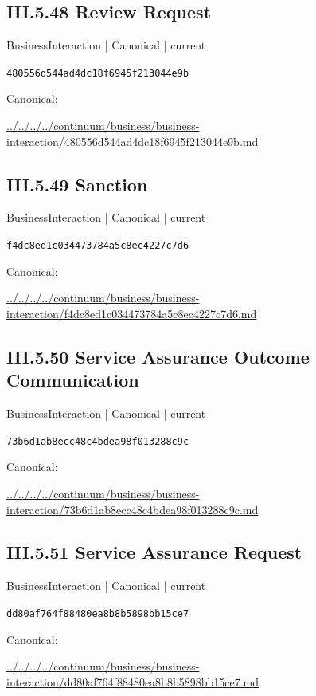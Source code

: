 \documentclass[10pt,a4paper]{article}
\begin{document}
\subsection*{III.5.48 Review Request}
\label{element-480556d544ad4dc18f6945f213044e9b}
{\small BusinessInteraction | Canonical | current}\par
\texttt{480556d544ad4dc18f6945f213044e9b}\par
Canonical: \par
{\footnotesize\url{../../../../continuum/business/business-interaction/480556d544ad4dc18f6945f213044e9b.md}}\par
\subsection*{III.5.49 Sanction}
\label{element-f4dc8ed1c034473784a5c8ec4227c7d6}
{\small BusinessInteraction | Canonical | current}\par
\texttt{f4dc8ed1c034473784a5c8ec4227c7d6}\par
Canonical: \par
{\footnotesize\url{../../../../continuum/business/business-interaction/f4dc8ed1c034473784a5c8ec4227c7d6.md}}\par
\subsection*{III.5.50 Service Assurance Outcome Communication}
\label{element-73b6d1ab8ecc48c4bdea98f013288c9c}
{\small BusinessInteraction | Canonical | current}\par
\texttt{73b6d1ab8ecc48c4bdea98f013288c9c}\par
Canonical: \par
{\footnotesize\url{../../../../continuum/business/business-interaction/73b6d1ab8ecc48c4bdea98f013288c9c.md}}\par
\subsection*{III.5.51 Service Assurance Request}
\label{element-dd80af764f88480ea8b8b5898bb15ce7}
{\small BusinessInteraction | Canonical | current}\par
\texttt{dd80af764f88480ea8b8b5898bb15ce7}\par
Canonical: \par
{\footnotesize\url{../../../../continuum/business/business-interaction/dd80af764f88480ea8b8b5898bb15ce7.md}}\par
\end{document}
